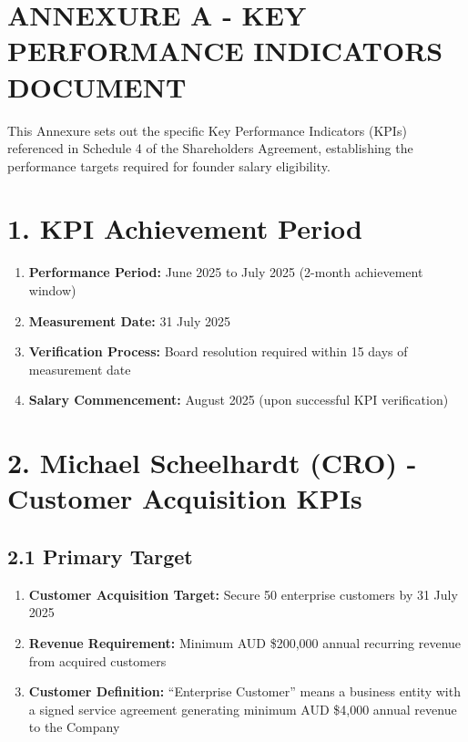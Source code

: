 \section*{ANNEXURE A - KEY PERFORMANCE INDICATORS DOCUMENT}

This Annexure sets out the specific Key Performance Indicators (KPIs) referenced in Schedule 4 of the Shareholders Agreement, establishing the performance targets required for founder salary eligibility.

\section*{1. KPI Achievement Period}

\begin{enumerate}[label=\arabic*.]
\item \textbf{Performance Period:} June 2025 to July 2025 (2-month achievement window)
\item \textbf{Measurement Date:} 31 July 2025
\item \textbf{Verification Process:} Board resolution required within 15 days of measurement date
\item \textbf{Salary Commencement:} August 2025 (upon successful KPI verification)
\end{enumerate}

\section*{2. Michael Scheelhardt (CRO) - Customer Acquisition KPIs}

\subsection*{2.1 Primary Target}
\begin{enumerate}[label=\arabic*.]
\item \textbf{Customer Acquisition Target:} Secure 50 enterprise customers by 31 July 2025
\item \textbf{Revenue Requirement:} Minimum AUD \$200,000 annual recurring revenue from acquired customers
\item \textbf{Customer Definition:} ``Enterprise Customer'' means a business entity with a signed service agreement generating minimum AUD \$4,000 annual revenue to the Company
\end{enumerate}

